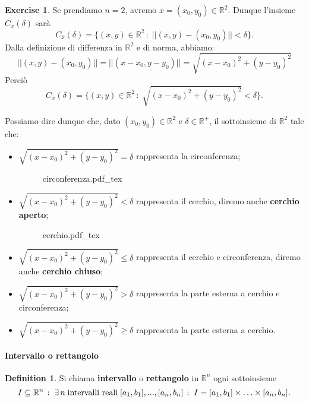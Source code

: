 \documentclass{article}
\theoremstyle{plain}
\theoremstyle{definition}
\newtheorem{defn}{Definition}[section]
\newtheorem{xca}[exmp]{Exercise}
\theoremstyle{remark}
\newcommand{\incfig}[2][\columnwidth]{%
    \def\svgwidth{#1}
    {#2.pdf_tex}
}
\begin{document}
\begin{xca}
    Se prendiamo $n=2$, avremo $\overline{x}=(x_0,y_0)\in\mathbb{R}^2$. 
    Dunque l'insieme $C_{\overline{x}}(\delta)$ sarà
    \[C_{\overline{x}}(\delta)=\{(x,y)\in\mathbb{R}^2\,:\;||(x,y)-(x_0,y_0)||<\delta\}.\]
    Dalla definizione di differenza in $\mathbb{R}^2$ e di norma, abbiamo:
    \[||(x,y)-(x_0,y_0)||=||(x-x_0,y-y_0)||=\sqrt{(x-x_0)^2+(y-y_0)^2}\]
    Perciò
    \[C_{\overline{x}}(\delta)=\{(x,y)\in\mathbb{R}^2\,:\;\sqrt{(x-x_0)^2+(y-y_0)^2}<\delta\}.\]

    Possiamo dire dunque che, dato $(x_0,y_0)\in\mathbb{R}^2$ e $\delta\in\mathbb{R}^+$, il sottoinsieme di $\mathbb{R}^2$ tale che:
    \begin{itemize}
        \item $\sqrt{(x-x_0)^2+(y-y_0)^2}=\delta$ rappresenta la circonferenza;
        \begin{figure}[H]
            \centering
            \incfig[0.5\linewidth]{circonferenza}
        \end{figure}
        \item $\sqrt{(x-x_0)^2+(y-y_0)^2}<\delta$ rappresenta il cerchio, diremo anche \textbf{cerchio aperto};
        \begin{figure}[H]
            \centering
            \incfig[0.5\linewidth]{cerchio}
        \end{figure}
        \item $\sqrt{(x-x_0)^2+(y-y_0)^2}\leq \delta$ rappresenta il cerchio e circonferenza, diremo anche \textbf{cerchio chiuso};
        \item $\sqrt{(x-x_0)^2+(y-y_0)^2}> \delta$ rappresenta la parte esterna a cerchio e circonferenza;
        \item $\sqrt{(x-x_0)^2+(y-y_0)^2}\geq \delta$ rappresenta la parte esterna a cerchio.
    \end{itemize}
\end{xca}

\vspace{10pt}

\paragraph{Intervallo o rettangolo}
\begin{bxthm}
\begin{defn}
    Si chiama \textbf{intervallo} o \textbf{rettangolo} in $\mathbb{R}^n$ ogni sottoinsieme
    \[I\subseteq\mathbb{R}^n\,:\;\exists\, n\; \textup{intervalli reali}\; [a_1,b_1],...,[a_n,b_n]\,:\;I=[a_1,b_1]\times\ldots\times[a_n,b_n].\]
\end{defn}
\end{bxthm}
\end{document}
